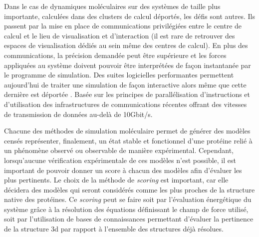 Dans le cas de dynamiques moléculaires sur des systèmes de taille plus importante, calculées dans des clusters de calcul déportés, les défis sont autres. Ils passent par la mise en place de communications privilégiées entre le centre de calcul et le lieu de visualisation et d'interaction (il est rare de retrouver des espaces de visualisation dédiés au sein même des centres de calcul). En plus des communications, la précision demandée peut être supérieure et les forces appliquées au système doivent pouvoir être interprétées de façon instantanée par le programme de simulation. Des suites logicielles performantes permettent aujourd'hui de traiter une simulation de façon interactive alors même que cette dernière est déportée \cite{dreher2014exaviz}. Basée sur les principes de parallélisation d'instructions et d'utilisation des infrastructures de communications récentes offrant des vitesses de transmission de données au-delà de 10Gbit/s.

 \label{simu_eval}

Chacune des méthodes de simulation moléculaire permet de générer des modèles censés représenter, finalement, un état stable et fonctionnel d'une protéine relié à un phénomène observé ou observable de manière expérimental. Cependant, lorsqu'aucune vérification expérimentale de ces modèles n'est possible, il est important de pouvoir donner un score à chacun des modèles afin d'évaluer les plus pertinents. Le choix de la méthode de \textit{scoring} est important, car elle décidera des modèles qui seront considérés comme les plus proches de la structure native des protéines. Ce \textit{scoring} peut se faire soit par l'évaluation énergétique du système grâce à la résolution des équations définissant le champ de force utilisé, soit par l'utilisation de bases de connaissances permettant d'évaluer la pertinence de la structure 3d par rapport à l'ensemble des structures déjà résolues.

